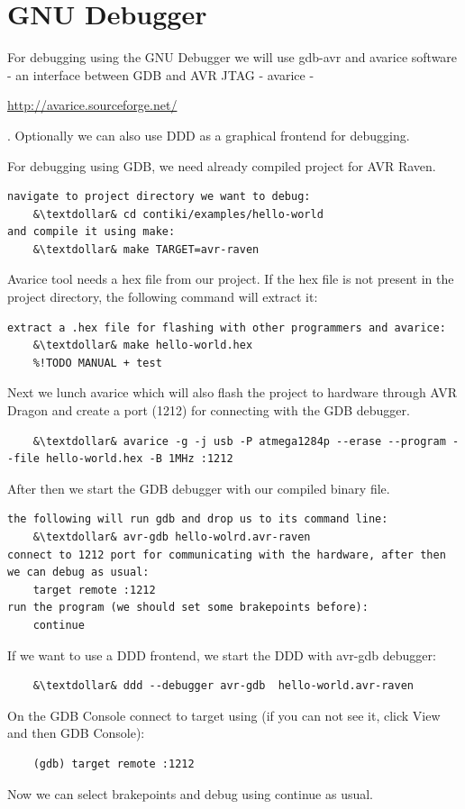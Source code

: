 \documentclass{article}
\begin{document}
\section{GNU Debugger}
For debugging using the GNU Debugger we will use gdb-avr and avarice software -
an interface between GDB and AVR JTAG - avarice - {\url{http://avarice.sourceforge.net/}{.
Optionally we can also use DDD as a graphical frontend for debugging.

For debugging using GDB, we need already compiled project for AVR Raven.
\begin{lstlisting}
navigate to project directory we want to debug:
	&\textdollar& cd contiki/examples/hello-world
and compile it using make:
	&\textdollar& make TARGET=avr-raven
\end{lstlisting}
Avarice tool needs a hex file from our project.
If the hex file is not present in the project directory, the following command will extract it:
\begin{lstlisting}
extract a .hex file for flashing with other programmers and avarice:
	&\textdollar& make hello-world.hex
	%!TODO MANUAL + test
\end{lstlisting}

Next we lunch avarice which will also flash the project to hardware
through AVR Dragon and
create a port (1212) for connecting with the GDB debugger.
\begin{lstlisting}
	&\textdollar& avarice -g -j usb -P atmega1284p --erase --program --file hello-world.hex -B 1MHz :1212
\end{lstlisting}
After then we start the GDB debugger with our compiled binary file.
\begin{lstlisting}
the following will run gdb and drop us to its command line:
	&\textdollar& avr-gdb hello-wolrd.avr-raven
connect to 1212 port for communicating with the hardware, after then we can debug as usual:
	target remote :1212
run the program (we should set some brakepoints before):
	continue
\end{lstlisting}
If we want to use a DDD frontend, we start the DDD with avr-gdb debugger:
\begin{lstlisting}
	&\textdollar& ddd --debugger avr-gdb  hello-world.avr-raven
\end{lstlisting}
On the GDB Console connect to target using (if you can not see it, click View and then GDB Console):
\begin{lstlisting}
	(gdb) target remote :1212
\end{lstlisting}
Now we can select brakepoints and debug using continue as usual.

}}
\end{document}
